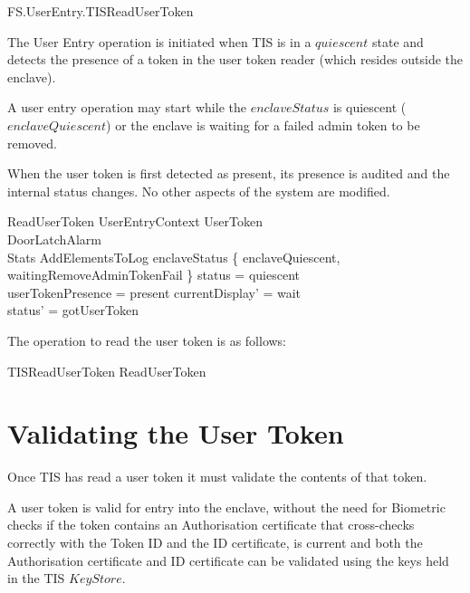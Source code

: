 \begin{traceunit}{FS.UserEntry.TISReadUserToken}
\end{traceunit}

The User Entry operation is initiated when TIS is in a $quiescent$ state
and detects the presence of
a token in the user token reader (which resides outside the enclave). 

A user entry operation may start while the $enclaveStatus$ is
quiescent ($enclaveQuiescent$) or the enclave is waiting for a failed
admin token to be removed.

When the user token is first detected as present, its presence is
audited and the internal status changes. 
No other aspects of the system are modified.

\begin{schema}{ReadUserToken}
        UserEntryContext
\also
        \Xi UserToken
\\	\Xi DoorLatchAlarm
\\      \Xi Stats
\also
        AddElementsToLog
\where
        enclaveStatus \in \{ enclaveQuiescent,
        waitingRemoveAdminTokenFail \}
\also
	status = quiescent
\\	userTokenPresence = present
\also
	currentDisplay' = wait
\\	status' = gotUserToken
\end{schema}

The operation to read the user token is as follows:

\begin{zed}
        TISReadUserToken   ReadUserToken
\end{zed}


\section{Validating the User Token}
Once TIS has read a user token it must validate the contents of that
token.

A user token is valid for entry into the enclave, without the need for
Biometric checks if the token contains an Authorisation certificate that
cross-checks correctly with the Token ID and the ID certificate, is
current and  both the Authorisation certificate and ID certificate can be
validated using the keys held in the TIS $KeyStore$. 

